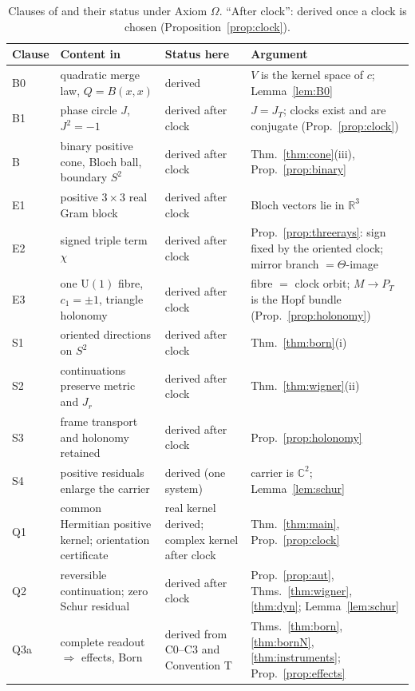\documentclass[aps,pra,onecolumn,superscriptaddress,nofootinbib,10pt]{revtex4-2}
\theoremstyle{definition}
\theoremstyle{remark}
\newcommand{\R}{\mathbb{R}}
\newcommand{\C}{\mathbb{C}}
\newcommand{\U}{\mathrm{U}}
\begin{document}
\begin{table}[h]
\caption{Clauses of \cite{CRQO} and their status under Axiom $\Omega$.  ``After clock'': derived once a
clock is chosen (Proposition~\ref{prop:clock}).}
\label{tab:clauses}
\footnotesize
\begin{tabular}{@{}p{}p{}p{}p{}@{}}
\toprule
Clause & Content in \cite{CRQO} & Status here & Argument\\
\midrule
B0 & quadratic merge law, $Q=B(x,x)$ & derived & $V$ is the kernel space of $c$; Lemma~\ref{lem:B0}\\
B1 & phase circle $J$, $J^2=-1$ & derived after clock & $J=J_T$; clocks exist and are conjugate (Prop.~\ref{prop:clock})\\
B & binary positive cone, Bloch ball, boundary $S^2$ & derived after clock & Thm.~\ref{thm:cone}(iii), Prop.~\ref{prop:binary}\\
E1 & positive $3\times3$ real Gram block & derived after clock & Bloch vectors lie in $\R^3$\\
E2 & signed triple term $\chi$ & derived after clock & Prop.~\ref{prop:threerays}: sign fixed by the oriented clock; mirror branch $=\Theta$-image\\
E3 & one $\U(1)$ fibre, $c_1=\pm1$, triangle holonomy & derived after clock & fibre $=$ clock orbit; $M\to P_T$ is the Hopf bundle (Prop.~\ref{prop:holonomy})\\
S1 & oriented directions on $S^2$ & derived after clock & Thm.~\ref{thm:born}(i)\\
S2 & continuations preserve metric and $J_r$ & derived after clock & Thm.~\ref{thm:wigner}(ii)\\
S3 & frame transport and holonomy retained & derived after clock & Prop.~\ref{prop:holonomy}\\
S4 & positive residuals enlarge the carrier & derived (one system) & carrier is $\C^2$; Lemma~\ref{lem:schur}\\
\textsf{Q1} & common Hermitian positive kernel; orientation certificate & real kernel derived; complex kernel after clock & Thm.~\ref{thm:main}, Prop.~\ref{prop:clock}\\
\textsf{Q2} & reversible continuation; zero Schur residual & derived after clock & Prop.~\ref{prop:aut}, Thms.~\ref{thm:wigner}, \ref{thm:dyn}; Lemma~\ref{lem:schur}\\
\textsf{Q3a} & complete readout $\Rightarrow$ effects, Born & derived from C0--C3 and Convention T & Thms.~\ref{thm:born}, \ref{thm:bornN}, \ref{thm:instruments}; Prop.~\ref{prop:effects}\\

\end{tabular}
\end{table}
\end{document}
